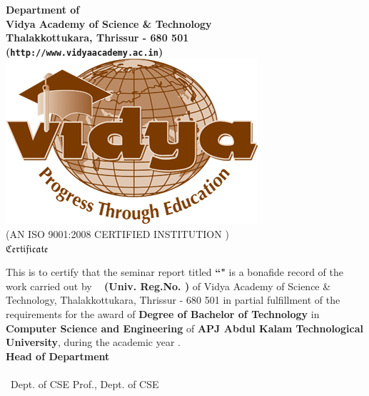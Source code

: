 
\begin{titlepage}


\begin{center}


{\Large \bf Department of \vdept  }\\
{\Large \bf Vidya Academy of Science \& Technology}\\
{\normalsize \bf Thalakkottukara, Thrissur - 680 501\\
({\tt http://www.vidyaacademy.ac.in})}\\[0.75cm]
%
%
\includegraphics[width=3.5 cm]{VidyaLogo.JPG}\\
\scriptsize (AN ISO 9001:2008 CERTIFIED INSTITUTION )\\[1 cm]
%
 \Huge  $ \mathfrak{Certificate}$\\[0.5cm]
%
\end{center}

\quad This is to certify that the seminar report titled {\bf ``\vtitle"} is a bonafide record of the work carried out by {\bf \vauthor\ } {\bf (Univ. Reg.No. \vregisternumber) } of Vidya Academy of Science \& Technology, Thalakkottukara, Thrissur - 680 501 in partial fulfillment of the requirements for the award of {\bf Degree of Bachelor of Technology} in {\bf Computer Science and  Engineering} of  {\bf APJ Abdul Kalam Technological University}, during the academic year \vacademicyear. \\[2 cm]
 
 \hfill  {\bf Head of Department} \\[.3cm]
\noindent \vguide \hfill \vhod \\ \vguidedg\ Dept. of  CSE \hfill Prof., Dept. of CSE  



%
\end{titlepage}


%  